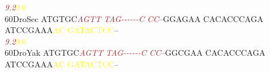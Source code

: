 \documentclass[11pt,twoside,reqno,a4paper]{article}
\begin{document}
{\hspace*{4\charwidth}\hspace*{7\charwidth}\hspace*{6\charwidth}\textit{\textcolor{Brown}{9.2}}\hspace*{1\charwidth}\hspace*{1\charwidth}\hspace*{1\charwidth}\hspace*{1\charwidth}\hspace*{39\charwidth}\textcolor{Yellow}{9.0}\hspace*{1\charwidth}\hspace*{1\charwidth}\\
60\hspace*{2\charwidth}DroSec	ATGTGC\textit{\textcolor{Brown}{A}}\textit{\textcolor{Brown}{G}}\textit{\textcolor{Brown}{T}}\textit{\textcolor{Brown}{T}}	\textit{\textcolor{Brown}{T}}\textit{\textcolor{Brown}{A}}\textit{\textcolor{Brown}{G}}\textit{\textcolor{Brown}{-}}\textit{\textcolor{Brown}{-}}\textit{\textcolor{Brown}{-}}\textit{\textcolor{Brown}{-}}\textit{\textcolor{Brown}{-}}\textit{\textcolor{Brown}{-}}\textit{\textcolor{Brown}{C}}	\textit{\textcolor{Brown}{C}}\textit{\textcolor{Brown}{C}}--GGAGAA	CACACCCAGA	ATCCGAAA\textcolor{Yellow}{A}\textcolor{Yellow}{C}	\textcolor{Yellow}{G}\textcolor{Yellow}{A}\textcolor{Yellow}{T}\textcolor{Yellow}{A}\textcolor{Yellow}{C}\textcolor{Yellow}{T}\textcolor{Yellow}{C}\textcolor{Yellow}{C}--	\\
\hspace*{4\charwidth}\hspace*{7\charwidth}\hspace*{6\charwidth}\textit{\textcolor{Brown}{9.2}}\hspace*{1\charwidth}\hspace*{1\charwidth}\hspace*{1\charwidth}\hspace*{1\charwidth}\hspace*{39\charwidth}\textcolor{Yellow}{9.0}\hspace*{1\charwidth}\hspace*{1\charwidth}\\
60\hspace*{2\charwidth}DroYak	ATGTGC\textit{\textcolor{Brown}{A}}\textit{\textcolor{Brown}{G}}\textit{\textcolor{Brown}{T}}\textit{\textcolor{Brown}{T}}	\textit{\textcolor{Brown}{T}}\textit{\textcolor{Brown}{A}}\textit{\textcolor{Brown}{G}}\textit{\textcolor{Brown}{-}}\textit{\textcolor{Brown}{-}}\textit{\textcolor{Brown}{-}}\textit{\textcolor{Brown}{-}}\textit{\textcolor{Brown}{-}}\textit{\textcolor{Brown}{-}}\textit{\textcolor{Brown}{C}}	\textit{\textcolor{Brown}{C}}\textit{\textcolor{Brown}{C}}--GGCGAA	CACACCCAGA	ATCCGAAA\textcolor{Yellow}{A}\textcolor{Yellow}{C}	\textcolor{Yellow}{G}\textcolor{Yellow}{A}\textcolor{Yellow}{T}\textcolor{Yellow}{A}\textcolor{Yellow}{C}\textcolor{Yellow}{T}\textcolor{Yellow}{C}\textcolor{Yellow}{C}--	\\
}
\end{document}

